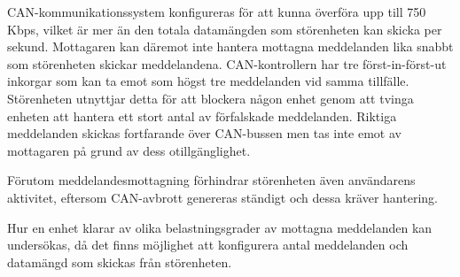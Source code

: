CAN-kommunikationssystem konfigureras för att kunna överföra upp till 750 Kbps, vilket är mer än den totala datamängden som störenheten kan skicka per sekund. Mottagaren kan däremot inte hantera mottagna meddelanden lika snabbt som störenheten skickar meddelandena. CAN-kontrollern har tre först-in-först-ut inkorgar som kan ta emot som högst tre meddelanden vid samma tillfälle. Störenheten utnyttjar detta för att blockera någon enhet genom att tvinga enheten att hantera ett stort antal av förfalskade meddelanden. Riktiga meddelanden skickas fortfarande över CAN-bussen men tas inte emot av mottagaren på grund av dess otillgänglighet.

Förutom meddelandesmottagning förhindrar störenheten även användarens aktivitet, eftersom CAN-avbrott genereras ständigt och dessa kräver hantering.

Hur en enhet klarar av olika belastningsgrader av mottagna meddelanden kan undersökas, då det finns möjlighet att konfigurera antal meddelanden och datamängd som skickas från störenheten.



